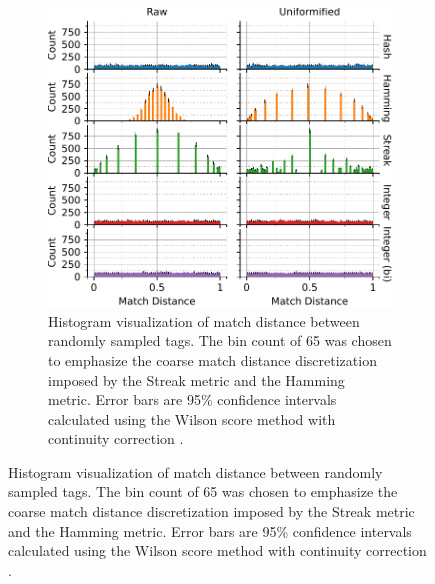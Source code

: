 \begin{figure}[!htbp]
\begin{center}

\begin{minipage}{\linewidth}
\begin{subfigure}[b]{\linewidth}
\begin{minipage}{0.75\textwidth}
\begin{center}
\includegraphics[width=\columnwidth]{img/uniformification/bitweight=0dot5+seed=1+title=low-score-distribution+viz=hist+_data_hathash_hash=75684cf1e73fb7f1+_script_fullcat_hash=dc969d47b9aa144d+ext=}
\end{center}
\end{minipage}
\begin{minipage}{0.23\textwidth}
\caption{
Histogram visualization of match distance between randomly sampled tags.
The bin count of 65 was chosen to emphasize the coarse match distance discretization imposed by the Streak metric and the Hamming metric.\footnotemark
Error bars are 95\% confidence intervals calculated using the Wilson score method with continuity correction \citep{newcombe1998two}.
}
\label{fig:uniformification_hist}
\end{minipage}
\end{subfigure}
\end{minipage}


\end{center}
\end{figure}
